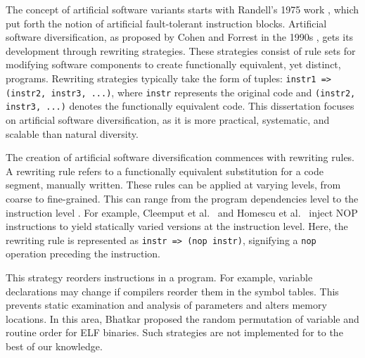 \begin{strategy}
    \label{artificial_diversity}
    The concept of artificial software variants starts with Randell's 1975 work \cite{10.1145/390016.808467}, which put forth the notion of artificial fault-tolerant instruction blocks. 
    Artificial software diversification, as proposed by Cohen and Forrest in the 1990s \cite{cohen1993operating, 595185}, gets its development through rewriting strategies. 
    These strategies consist of rule sets for modifying software components to create functionally equivalent, yet distinct, programs. 
    Rewriting strategies typically take the form of tuples: \texttt{instr1 => (instr2, instr3, ...)}, where \texttt{instr} represents the original code and \texttt{(instr2, instr3, ...)} denotes the functionally equivalent code.
    This dissertation focuses on artificial software diversification, as it is more practical, systematic, and scalable than natural diversity.
\end{strategy}

\begin{strategy}
    \label{rewriting_strategy}
    The creation of artificial software diversification commences with rewriting rules.
    A rewriting rule refers to a functionally equivalent substitution for a code segment, manually written. 
    These rules can be applied at varying levels, from coarse to fine-grained. 
    This can range from the program dependencies level \cite{Harrand1650630} to the instruction level \cite{offensive_div}. 
    For example, Cleemput et al.~\cite{Cleemput2012} and Homescu et al.~\cite{homescu2013profile} inject NOP instructions to yield statically varied versions at the instruction level. 
    Here, the rewriting rule is represented as \texttt{instr => (nop instr)}, signifying a \texttt{nop} operation preceding the instruction.


\end{strategy}



\begin{strategy}
    \label{instruction_reordering}
    This strategy reorders instructions in a program.
    For example, variable declarations may change if compilers reorder them in the symbol tables. 
    This prevents static examination and analysis of parameters and alters memory locations. 
    In this area, Bhatkar \etal \cite{bhatkar03, bhatkar2005efficient} proposed the random permutation of variable and routine order for ELF binaries.
    Such strategies are not implemented for \Wasm to the best of our knowledge.
\end{strategy}


